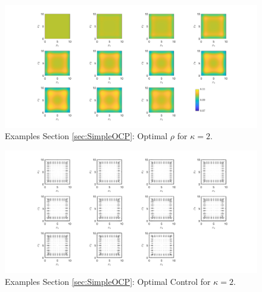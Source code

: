 \documentclass[11pt, a4paper]{article}
\theoremstyle{definition}
\begin{document}
	\begin{figure}[h]
		\centering
		\includegraphics[scale=0.35]{Simplerhok.png}
		\caption{Examples Section \ref{sec:SimpleOCP}: Optimal $\rho$ for $\kappa = 2$.} 
		\label{FSc}
	\end{figure}
	\begin{figure}[h]
		\centering
		\includegraphics[scale=0.35]{SimpleConk.png}
		\caption{Examples Section \ref{sec:SimpleOCP}: Optimal Control for $\kappa = 2$.} 
		\label{FSd}
	\end{figure}
\end{document}

